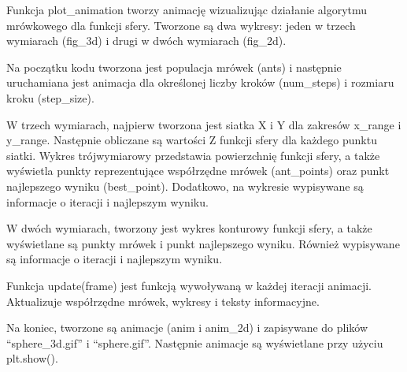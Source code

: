 \documentclass[11pt]{article}
\begin{document}
Funkcja plot\_animation tworzy animację wizualizując działanie algorytmu
mrówkowego dla funkcji sfery. Tworzone są dwa wykresy: jeden w trzech
wymiarach (fig\_3d) i drugi w dwóch wymiarach (fig\_2d).

Na początku kodu tworzona jest populacja mrówek (ants) i następnie
uruchamiana jest animacja dla określonej liczby kroków (num\_steps) i
rozmiaru kroku (step\_size).

W trzech wymiarach, najpierw tworzona jest siatka X i Y dla zakresów
x\_range i y\_range. Następnie obliczane są wartości Z funkcji sfery dla
każdego punktu siatki. Wykres trójwymiarowy przedstawia powierzchnię
funkcji sfery, a także wyświetla punkty reprezentujące współrzędne
mrówek (ant\_points) oraz punkt najlepszego wyniku (best\_point).
Dodatkowo, na wykresie wypisywane są informacje o iteracji i najlepszym
wyniku.

W dwóch wymiarach, tworzony jest wykres konturowy funkcji sfery, a także
wyświetlane są punkty mrówek i punkt najlepszego wyniku. Również
wypisywane są informacje o iteracji i najlepszym wyniku.

Funkcja update(frame) jest funkcją wywoływaną w każdej iteracji
animacji. Aktualizuje współrzędne mrówek, wykresy i teksty informacyjne.

Na koniec, tworzone są animacje (anim i anim\_2d) i zapisywane do plików
``sphere\_3d.gif'' i ``sphere.gif''. Następnie animacje są wyświetlane
przy użyciu plt.show().
\end{document}
